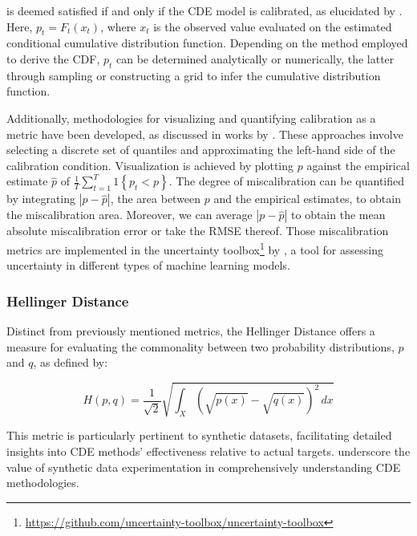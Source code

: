 \documentclass{article}
\begin{document}
is deemed satisfied if and only if the CDE model is calibrated, as elucidated by \citep{gneiting2007probabilistic}. Here, $p_t = F_t(x_t)$, where $x_t$ is the observed value evaluated on the estimated conditional cumulative distribution function. Depending on the method employed to derive the CDF, $p_t$ can be determined analytically or numerically, the latter through sampling or constructing a grid to infer the cumulative distribution function.

Additionally, methodologies for visualizing and quantifying calibration as a metric have been developed, as discussed in works by \citep{klotz2021uncertainty, chung2020beyond, tran2020methods, chung2021uncertainty}. These approaches involve selecting a discrete set of quantiles and approximating the left-hand side of the calibration condition. Visualization is achieved by plotting $p$ against the empirical estimate $\hat{p}$ of $\frac{1}{T} \sum_{t=1}^T 1\left\{p_t<p\right\}$. The degree of miscalibration can be quantified by integrating $| p - \hat{p} |$, the area between $p$ and the empirical estimates, to obtain the miscalibration area. Moreover, we can average $| p - \hat{p} |$ to obtain the mean absolute miscalibration error or take the RMSE thereof. Those miscalibration metrics are implemented in the uncertainty toolbox\footnote{\url{https://github.com/uncertainty-toolbox/uncertainty-toolbox}} by \citep{chung2021uncertainty}, a tool for assessing uncertainty in different types of machine learning models.


\subsubsection{Hellinger Distance}\label{sec:hellinger_distance}

Distinct from previously mentioned metrics, the Hellinger Distance offers a measure for evaluating the commonality between two probability distributions, \(p\) and \(q\), as defined by:

\begin{equation}
H(p, q) = \frac{1}{\sqrt{2}} \sqrt{\int_X (\sqrt{p(x)} - \sqrt{q(x)})^2 \, dx}
\end{equation}

This metric is particularly pertinent to synthetic datasets, facilitating detailed insights into CDE methods' effectiveness relative to actual targets. \citep{rothfuss2019conditional} underscore the value of synthetic data experimentation in comprehensively understanding CDE methodologies.
\end{document}
